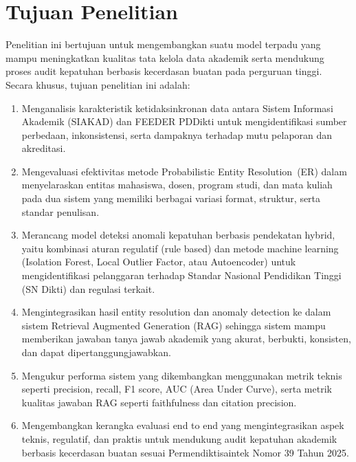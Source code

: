 \documentclass[12pt,a4paper,oneside]{report}
\begin{document}
\section{Tujuan Penelitian}
        Penelitian ini bertujuan untuk mengembangkan suatu model terpadu yang mampu meningkatkan kualitas tata kelola data akademik serta mendukung proses audit kepatuhan berbasis kecerdasan buatan pada perguruan tinggi. Secara khusus, tujuan penelitian ini adalah:
        \begin{enumerate}
            \item Menganalisis karakteristik ketidaksinkronan data antara Sistem Informasi Akademik (SIAKAD) dan FEEDER PDDikti untuk mengidentifikasi sumber perbedaan, inkonsistensi, serta dampaknya terhadap mutu pelaporan dan akreditasi.
            \item Mengevaluasi efektivitas metode Probabilistic Entity Resolution~(ER) dalam menyelaraskan entitas mahasiswa, dosen, program studi, dan mata kuliah pada dua sistem yang memiliki berbagai variasi format, struktur, serta standar penulisan.
            \item Merancang model deteksi anomali kepatuhan berbasis pendekatan hybrid, yaitu kombinasi aturan regulatif (rule based) dan metode machine learning (Isolation Forest, Local Outlier Factor, atau Autoencoder) untuk mengidentifikasi pelanggaran terhadap Standar Nasional Pendidikan Tinggi (SN Dikti) dan regulasi terkait.
            \item Mengintegrasikan hasil entity resolution dan anomaly detection ke dalam sistem Retrieval Augmented Generation (RAG) sehingga sistem mampu memberikan jawaban tanya jawab akademik yang akurat, berbukti, konsisten, dan dapat dipertanggungjawabkan.
            \item Mengukur performa sistem yang dikembangkan menggunakan metrik teknis seperti precision, recall, F1 score, AUC (Area Under Curve), serta metrik kualitas jawaban RAG seperti faithfulness dan citation precision.
            \item Mengembangkan kerangka evaluasi end to end yang mengintegrasikan aspek teknis, regulatif, dan praktis untuk mendukung audit kepatuhan akademik berbasis kecerdasan buatan sesuai Permendiktisaintek Nomor 39 Tahun 2025.
        \end{enumerate}
\end{document}
